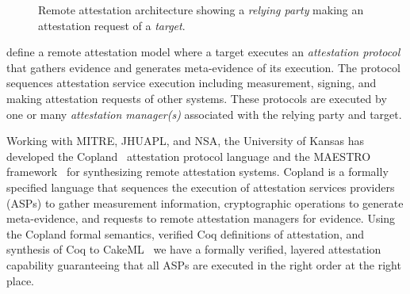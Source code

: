 \documentclass[runningheads]{llncs}
\begin{document}
\begin{figure}[hbtp]
  \centering
  \caption{Remote attestation architecture
  showing a \emph{relying party} making an attestation request of a
  \emph{target}.}
  \label{fig:remote-attestation}
\end{figure}

\citet{Coker::Principles-of-R,Coker:08:Attestation:-Ev} define a remote
attestation model where a target executes an \emph{attestation protocol} that
gathers evidence and generates meta-evidence of its execution. The protocol
sequences attestation service execution including measurement, signing, and
making attestation requests of other systems.  These protocols are executed by
one or many \emph{attestation manager(s)} associated with the relying party and target.

Working with MITRE, JHUAPL, and NSA, the University of Kansas has developed the
Copland~\citep{Ramsdell:2019aa} attestation protocol language and the MAESTRO
framework~\citep{petz2022innovations,
Petz:2024:Verified-Configuration-and-Deployment-Paper}
for synthesizing remote attestation systems. Copland is a formally specified
language that sequences the execution of attestation services providers (ASPs)
to gather measurement information, cryptographic operations to generate
meta-evidence, and requests to remote attestation managers for evidence. Using
the Copland formal semantics, verified Coq definitions of attestation, and
synthesis of Coq to CakeML~\citep{Kumar:2014:CVI:2535838.2535841} we have a
formally verified, layered attestation capability guaranteeing that all ASPs are
executed in the right order at the right place.
 
\end{document}
